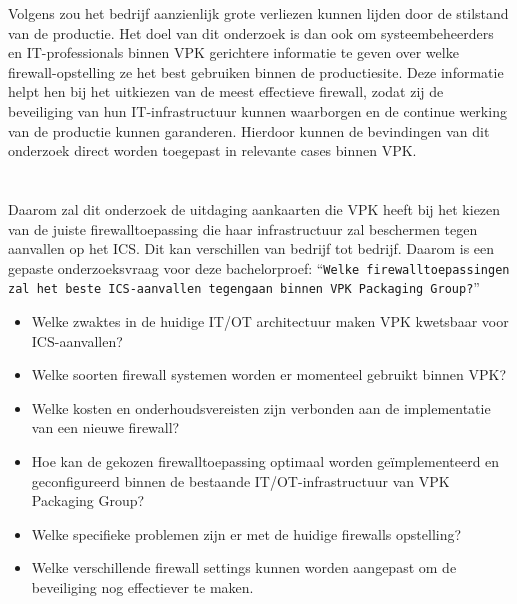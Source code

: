 \vspace{5mm}
Volgens \textcite{Nwanya2017} zou het bedrijf aanzienlijk grote verliezen kunnen lijden door de stilstand van de productie. Het doel van dit onderzoek is dan ook om systeembeheerders en IT-professionals binnen VPK gerichtere informatie te geven over welke firewall-opstelling ze het best gebruiken binnen de productiesite. Deze informatie helpt hen bij het uitkiezen van de meest effectieve firewall, zodat zij de beveiliging van hun IT-infrastructuur kunnen waarborgen en de continue werking van de productie kunnen garanderen. Hierdoor kunnen de bevindingen van dit onderzoek direct worden toegepast in relevante cases binnen VPK.

\section{}%
\label{sec:onderzoeksvraag}

Daarom zal dit onderzoek de uitdaging aankaarten die VPK heeft bij het kiezen van de juiste firewalltoepassing die haar infrastructuur zal beschermen tegen aanvallen op het ICS. Dit kan verschillen van bedrijf tot bedrijf. Daarom is een gepaste onderzoeksvraag voor deze bachelorproef: ``\texttt{Welke firewalltoepassingen zal het beste ICS-aanvallen tegengaan binnen VPK Packaging Group?}''

\begin{itemize}
    \item Welke zwaktes in de huidige IT/OT architectuur maken VPK kwetsbaar voor ICS-aanvallen?
    \item Welke soorten firewall systemen worden er momenteel gebruikt binnen VPK?
    \item Welke kosten en onderhoudsvereisten zijn verbonden aan de implementatie van een nieuwe firewall?
    \item Hoe kan de gekozen firewalltoepassing optimaal worden geïmplementeerd en geconfigureerd binnen de bestaande IT/OT-infrastructuur van VPK Packaging Group?
    \item Welke specifieke problemen zijn er met de huidige firewalls opstelling?
    \item Welke verschillende firewall settings kunnen worden aangepast om de beveiliging nog effectiever te maken.
    \end{itemize}

\section{}%
\label{sec:onderzoeksdoelstelling}

